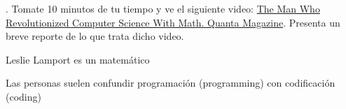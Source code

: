 . Tomate 10 minutos de tu tiempo y ve el siguiente video:
\href{https://www.youtube.com/watch?v=rkZzg7Vowao}{The Man
  Who Revolutionized Computer Science With Math. Quanta Magazine}.
Presenta un breve reporte de lo que trata dicho video.

Leslie Lamport es un matemático

Las personas suelen confundir programación (programming) con codificación (coding) 
